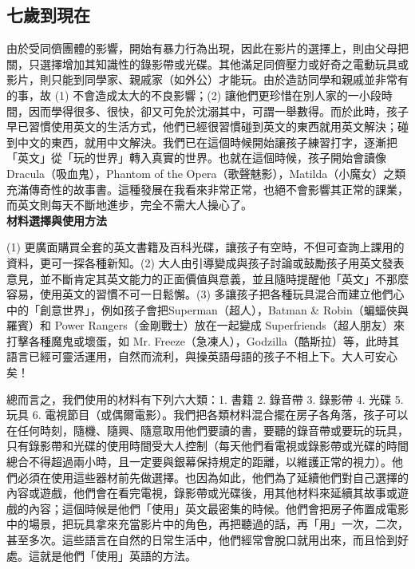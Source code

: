 \documentclass[12pt, a4paper]{article}
\begin{document}
\subsection{七歲到現在}
由於受同儕團體的影響，開始有暴力行為出現，因此在影片的選擇上，則由父母把關，只選擇增加其知識性的錄影帶或光碟。其他滿足同儕壓力或好奇之電動玩具或影片，則只能到同學家、親戚家（如外公）才能玩。由於造訪同學和親戚並非常有的事，故 (1) 不會造成太大的不良影響；(2) 讓他們更珍惜在別人家的一小段時間，因而學得很多、很快，卻又可免於沈溺其中，可謂一舉數得。而於此時，孩子早已習慣使用英文的生活方式，他們已經很習慣碰到英文的東西就用英文解決；碰到中文的東西，就用中文解決。我們已在這個時候開始讓孩子練習打字，逐漸把「英文」從「玩的世界」轉入真實的世界。也就在這個時候，孩子開始會讀像 Dracula（吸血鬼），Phantom of the Opera（歌聲魅影），Matilda（小魔女）之類充滿傳奇性的故事書。這種發展在我看來非常正常，也絕不會影響其正常的課業，而英文則每天不斷地進步，完全不需大人操心了。\\

\textbf{材料選擇與使用方法}

(1) 更廣面購買全套的英文書籍及百科光碟，讓孩子有空時，不但可查詢上課用的資料，更可一探各種新知。(2) 大人由引導變成與孩子討論或鼓勵孩子用英文發表意見，並不斷肯定其英文能力的正面價值與意義，並且隨時提醒他「英文」不那麼容易，使用英文的習慣不可一日鬆懈。(3) 多讓孩子把各種玩具混合而建立他們心中的「創意世界」，例如孩子會把Superman（超人），Batman \& Robin（蝙蝠俠與羅賓）和 Power Rangers（金剛戰士）放在一起變成 {\E Superfriends}（超人朋友）來打擊各種魔鬼或壞蛋，如 Mr. Freeze（急凍人），Godzilla（酷斯拉）等，此時其語言已經可靈活運用，自然而流利，與操英語母語的孩子不相上下。大人可安心矣！

總而言之，我們使用的材料有下列六大類：1. 書籍 2. 錄音帶 3. 錄影帶 4. 光碟 5. 玩具 6. 電視節目（或偶爾電影）。我們把各類材料混合擺在房子各角落，孩子可以在任何時刻，隨機、隨興、隨意取用他們要讀的書，要聽的錄音帶或要玩的玩具，只有錄影帶和光碟的使用時間受大人控制（每天他們看電視或錄影帶或光碟的時間總合不得超過兩小時，且一定要與銀幕保持規定的距離，以維護正常的視力）。他們必須在使用這些器材前先做選擇。也因為如此，他們為了延續他們對自己選擇的內容或遊戲，他們會在看完電視，錄影帶或光碟後，用其他材料來延續其故事或遊戲的內容；這個時候是他們「使用」英文最密集的時候。他們會把房子佈置成電影中的場景，把玩具拿來充當影片中的角色，再把聽過的話，再「用」一次，二次，甚至多次。這些語言在自然的日常生活中，他們經常會脫口就用出來，而且恰到好處。這就是他們「使用」英語的方法。
\end{document}
